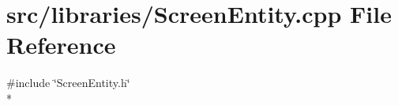 \section{src/libraries/\-Screen\-Entity.cpp File Reference}
\label{_screen_entity_8cpp}
{\ttfamily \#include \char`\"{}Screen\-Entity.\-h\char`\"{}}\\*
